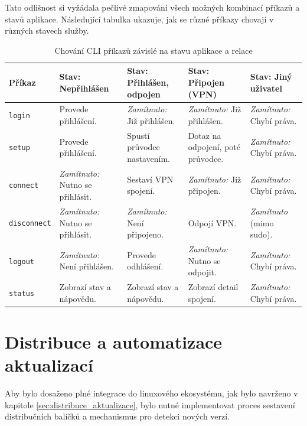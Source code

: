 Tato odlišnost si vyžádala pečlivé zmapování všech možných kombinací příkazů a stavů aplikace. Následující tabulka ukazuje, jak se různé příkazy chovají v různých stavech služby.

\begin{table}[htbp]
    \centering
    \begin{tabular}{|p{}|p{}|p{}|p{}|p{}|}
        \hline
        \textbf{Příkaz} & \textbf{Stav: Nepřihlášen} & \textbf{Stav: Přihlášen, odpojen} & \textbf{Stav: Připojen (VPN)} & \textbf{Stav: Jiný uživatel} \\
        \hline
        \texttt{login} & Provede přihlášení. & \textit{Zamítnuto:} Již přihlášen. & \textit{Zamítnuto:} Již přihlášen. & \textit{Zamítnuto:} Chybí práva. \\
        \hline
        \texttt{setup} & Provede přihlášení. & Spustí průvodce nastavením. & Dotaz na odpojení, poté průvodce. & \textit{Zamítnuto:} Chybí práva. \\
        \hline
        \texttt{connect} & \textit{Zamítnuto:} Nutno se přihlásit. & Sestaví VPN spojení. & \textit{Zamítnuto:} Již připojen. & \textit{Zamítnuto:} Chybí práva. \\
        \hline
        \texttt{disconnect} & \textit{Zamítnuto:} Nutno se přihlásit. & \textit{Zamítnuto:} Není připojeno. & Odpojí VPN. & \textit{Zamítnuto} (mimo sudo). \\
        \hline
        \texttt{logout} & \textit{Zamítnuto:} Není přihlášen. & Provede odhlášení. & \textit{Zamítnuto:} Nutno se odpojit. & \textit{Zamítnuto:} Chybí práva. \\
        \hline
        \texttt{status} & Zobrazí stav a nápovědu. & Zobrazí stav a nápovědu. & Zobrazí detail spojení. & \textit{Zamítnuto:} Chybí práva. \\
        \hline
    \end{tabular}
    \caption{Chování CLI příkazů závislé na stavu aplikace a relace}
    \label{tab:cli_states}
\end{table}

\section{Distribuce a automatizace aktualizací}
\label{sec:impl_distribuce}

Aby bylo dosaženo plné integrace do linuxového ekosystému, jak bylo navrženo v kapitole \ref{sec:distribuce_aktualizace}, bylo nutné implementovat proces sestavení distribučních balíčků a mechanismus pro detekci nových verzí.

